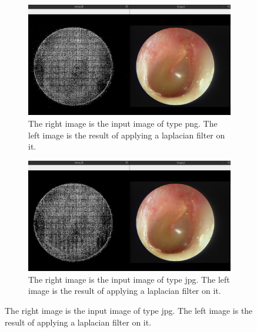 \begin{figure}[H]
    \centering
    \begin{subfigure}[t]{0.48\textwidth}
	    \includegraphics[width=\textwidth]{Figures/lv/lv_33_png.png}
	    \caption{The right image is the input image of type png. The left image is the result of applying a laplacian filter on it.}
    \end{subfigure}\hspace{1em}
    \begin{subfigure}[t]{0.48\textwidth}
    		\includegraphics[width=\textwidth]{Figures/lv/lv_33_jpg.png}
    		\caption{The right image is the input image of type jpg. The left image is the result of applying a laplacian filter on it.}
    \end{subfigure}\hspace{1em}


\end{figure}
